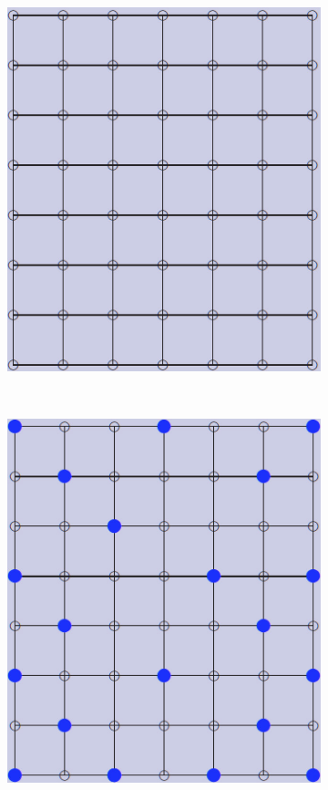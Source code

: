 \documentclass[12pt]{article}
\begin{document}
\begin{figure}[tb]
  \centering
  \begin{subfigure}[b]{0.2\textwidth}
      \includegraphics[width=\textwidth]{img/contract_kernel2}
      \caption{}\label{fig:contract_kernel1}
  \end{subfigure}
  ~
  \begin{subfigure}[b]{0.2\textwidth}
      \includegraphics[width=\textwidth]{img/contract_kernel3}

\end{subfigure}
\end{figure}
\end{document}

